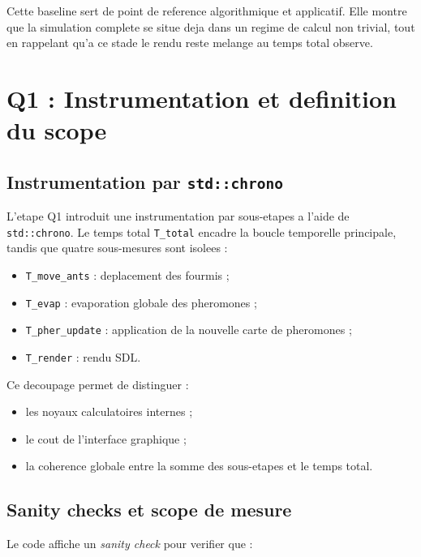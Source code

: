 \documentclass[11pt,a4paper]{article}
\begin{document}
Cette baseline sert de point de reference algorithmique et applicatif. Elle montre que la simulation complete se situe deja dans un regime de calcul non trivial, tout en rappelant qu'a ce stade le rendu reste melange au temps total observe.

\section{Q1 : Instrumentation et definition du scope}

\subsection{Instrumentation par \texttt{std::chrono}}

L'etape Q1 introduit une instrumentation par sous-etapes a l'aide de \texttt{std::chrono}. Le temps total \texttt{T\_total} encadre la boucle temporelle principale, tandis que quatre sous-mesures sont isolees :

\begin{itemize}[leftmargin=1.2em]
  \item \texttt{T\_move\_ants} : deplacement des fourmis ;
  \item \texttt{T\_evap} : evaporation globale des pheromones ;
  \item \texttt{T\_pher\_update} : application de la nouvelle carte de pheromones ;
  \item \texttt{T\_render} : rendu SDL.
\end{itemize}

Ce decoupage permet de distinguer :

\begin{itemize}[leftmargin=1.2em]
  \item les noyaux calculatoires internes ;
  \item le cout de l'interface graphique ;
  \item la coherence globale entre la somme des sous-etapes et le temps total.
\end{itemize}

\subsection{Sanity checks et scope de mesure}

Le code affiche un \emph{sanity check} pour verifier que :
\end{document}

